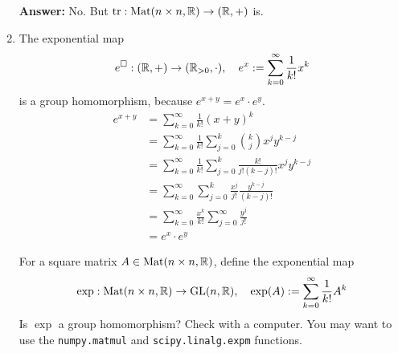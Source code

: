 \begin{enumerate}
    \textbf{Answer:} No. But $\operatorname{tr}: \operatorname{Mat}(n \times n,\mathbb{R}) \to (\mathbb{R},+)$ is.

  \item The exponential map 
    \begin{align*}
      e^{\square}: (\mathbb{R},+) \to (\mathbb{R}_{>0},\cdot), \quad
      e^{x} := \sum_{k=0}^{\infty} \frac{1}{k!} x^{k}
    \end{align*}
    is a group homomorphism, because $e^{x + y} = e^{x} \cdot e^{y}$.
    \begin{align*}
      e^{x+y}
      &=
      \sum_{k=0}^{\infty} \frac{1}{k!} {(x+y)}^{k}
      \\
      &=
      \sum_{k=0}^{\infty} \frac{1}{k!} \sum_{j=0}^{k} \binom{k}{j}x^{j}y^{k-j}
      \\
      &=
      \sum_{k=0}^{\infty} \frac{1}{k!} \sum_{j=0}^{k} \frac{k!}{j!(k-j)!}x^{j}y^{k-j}
      \\
      &=
      \sum_{k=0}^{\infty} \sum_{j=0}^{k}\frac{x^j}{j!}\frac{y^{k-j}}{(k-j)!}
      \\
      &= 
      \sum_{k=0}^{\infty} \frac{x^{k}}{k!} \sum_{j=0}^{\infty}\frac{y^{j}}{j!}
      \\
      &=
      e^{x} \cdot e^{y}
    \end{align*}

    For a square matrix $A \in \operatorname{Mat}(n \times n,\mathbb{R})$, define the exponential map
    \begin{align*}
      \exp: \operatorname{Mat}(n \times n,\mathbb{R}) \to \operatorname{GL}(n,\mathbb{R})
      ,
      \quad
      \exp(A) := \sum_{k=0}^{\infty}\frac{1}{k!}A^{k}
    \end{align*}
    Is $\exp$ a group homomorphism? Check with a computer.
    You may want to use the \texttt{numpy.matmul} and \texttt{scipy.linalg.expm} functions.


\end{enumerate}
